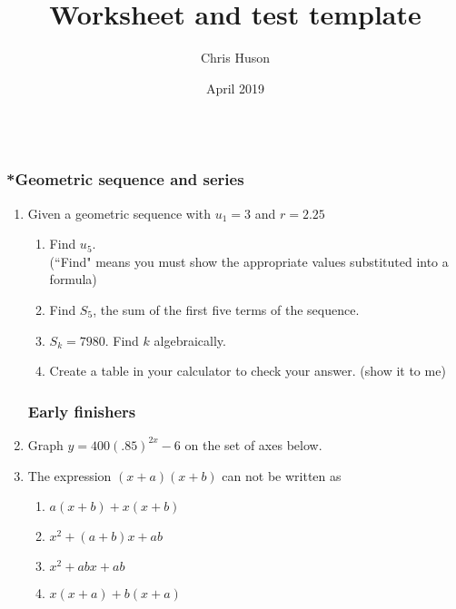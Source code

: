 \documentclass[12pt, oneside]{article}
\title{Worksheet and test template}
\author{Chris Huson}
\date{April 2019}
\begin{document}
\subsubsection*{\\*Geometric sequence and series}

\begin{enumerate}

\vspace{0.5 cm}


\item Given a geometric sequence with $u_1=3$ and $r=2.25$
  \begin{enumerate}
      \item Find $u_5$. \\
      (``Find" means you must show the appropriate values substituted into a formula)\\[95pt]
      \item Find $S_5$, the sum of the first five terms of the sequence.\\[145pt]
      \item $S_k=7980$. Find $k$ algebraically.\\[145pt]
      \item Create a table in your calculator to check your answer. (show it to me)
  \end{enumerate}

\newpage
\subsubsection*{Early finishers}

\item Graph $y=400(.85)^{2x}-6$ on the set of axes below.
\begin{center}
\end{center} %

\item The expression $(x + a)(x + b)$ can not be written as
\begin{enumerate}
    \item $a(x + b)+ x(x + b)$
    \item $x^2 + (a + b)x + ab$
    \item  $x^2 + abx + ab$
    \item $x(x + a)+ b(x + a)$
\end{enumerate}

\end{enumerate}
\end{document}
